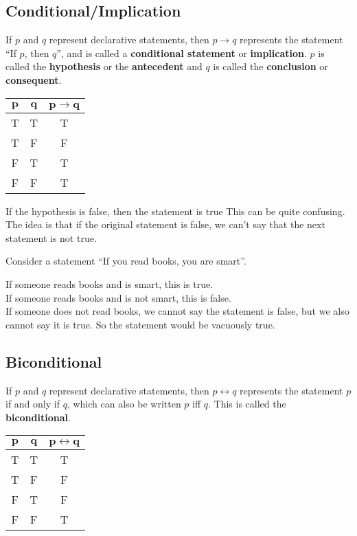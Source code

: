 \documentclass[../notes.tex]{subfiles}
\begin{document}
			\subsection[Conditional]{Conditional/Implication}
				If $p$ and $q$ represent declarative statements, then $p \rightarrow q$ represents the statement ``If $p$, then $q$'', and is called a \textbf{conditional statement} or \textbf{implication}. $p$ is called the \textbf{hypothesis} or the \textbf{antecedent} and $q$ is called the \textbf{conclusion} or \textbf{consequent}.
				\begin{center}
					\begin{tabular}{|c c | c|}
						\hline
						$\mathbf{p}$ & $\mathbf{q}$ & $\mathbf{p \rightarrow q}$\\
						\hline
						T & T & T\\
						T & F & F\\
						F & T & T\\
						F & F & T\\
						\hline
					\end{tabular}	
				\end{center}
				\begin{notebox}{If the hypothesis is false, then the statement is true}
					This can be quite confusing. The idea is that if the original statement is false, we can't say that the next statement is not true.
					\begin{examplebox}
						Consider a statement ``If you read books, you are smart''.
						\begin{adjustwidth}{1cm}{}
							If someone reads books and is smart, this is true.\\
							If someone reads books and is not smart, this is false.\\
							If someone does not read books, we cannot say the statement is false, but we also cannot say it is true. So the statement would be vacuously true.
						\end{adjustwidth}
					\end{examplebox} 
				\end{notebox}
			\pagebreak
			\subsection{Biconditional}
				If $p$ and $q$ represent declarative statements, then $p \leftrightarrow q$ represents the statement $p$ if and only if $q$, which can also be written $p$ iff $q$. This is called the \textbf{biconditional}.
				\begin{center}
					\begin{tabular}{|c c | c|}
						\hline
						$\mathbf{p}$ & $\mathbf{q}$ & $\mathbf{p \leftrightarrow q}$\\
						\hline
						T & T & T\\
						T & F & F\\
						F & T & F\\
						F & F & T\\
						\hline
					\end{tabular}	
				\end{center}
\end{document}
